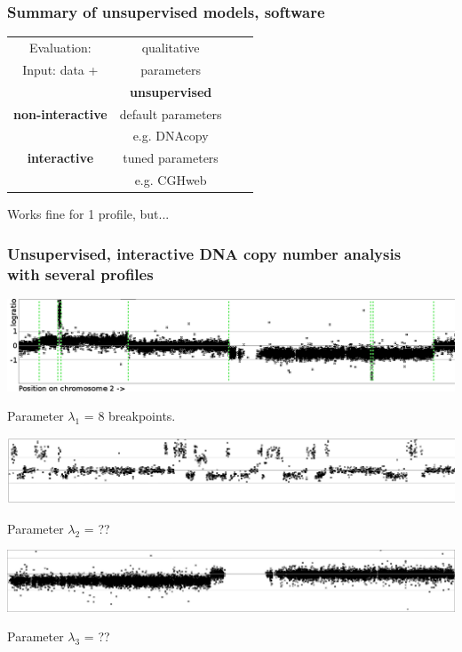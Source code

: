\documentclass{beamer}
\begin{document}
\begin{frame}
  \frametitle{Summary of unsupervised models, software}

  \begin{center}
  \begin{tabular}{c|c|c|c}
    Evaluation: & qualitative &  \\
    Input: data + & parameters & & \\
        & \textbf{unsupervised} & \\
    \hline
    \textbf{non-interactive}
    & default parameters &  \\
    & e.g. DNAcopy & \\
    \hline
    \textbf{interactive}
    & tuned parameters & \mbox{\hskip 1in} & \\
    & e.g. CGHweb & 
  \end{tabular}
  \end{center}

  Works fine for 1 profile, but...

\end{frame}

\begin{frame}
  \frametitle{Unsupervised, interactive DNA copy number analysis\\
  with several profiles}
  \includegraphics[width=\textwidth]{unlabeled-breakpoints-8}

  Parameter $\lambda_1$ = 8 breakpoints.

  \vskip 0.1in

  \includegraphics[width=\textwidth]{lots-of-breaks}

  Parameter $\lambda_2$ = ??

  \vskip 0.1in

  \includegraphics[width=\textwidth]{only-one-break}

  Parameter $\lambda_3$ = ??

\end{frame}
\end{document}

